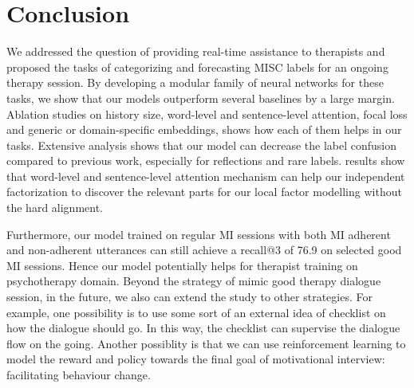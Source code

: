 \section{Conclusion}
\label{sec:snt:conclusion}

We addressed the question of providing real-time assistance to
therapists and proposed the tasks of categorizing and forecasting MISC
labels for an ongoing therapy session. By developing a modular family
of neural networks for these tasks, we show that our models outperform
several baselines by a large margin.  Ablation studies on history
size, word-level and sentence-level attention, focal loss and generic
or domain-specific embeddings, shows how each of them helps in our
tasks. Extensive analysis shows that our model can decrease the label
confusion compared to previous work, especially for reflections and
rare labels. results show that word-level and sentence-level attention
mechanism can help our independent factorization to discover the
relevant parts for our local factor modelling without the hard
alignment.

Furthermore, our model trained on regular MI sessions with both MI
adherent and non-adherent utterances can still achieve a recall@3 of
76.9 on selected good MI sessions. Hence our model potentially helps
for therapist training on psychotherapy domain. Beyond the strategy of
mimic good therapy dialogue session, in the future, we also can extend
the study to other strategies. For example, one possibility is to use
some sort of an external idea of checklist on how the dialogue should
go. In this way, the checklist can supervise the dialogue flow on the
going. Another possiblity is that we can use reinforcement learning to
model the reward and policy towards the final goal of motivational
interview: facilitating behaviour change.

